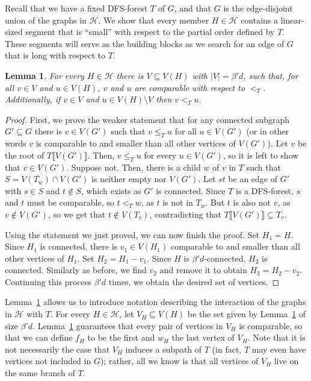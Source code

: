 \documentclass[10pt]{article}
\newtheorem{lemma}[theorem]{Lemma}
\theoremstyle{definition}
\let\leq\leqslant
\begin{document}
Recall that we have a fixed DFS-forest $T$ of $G$, and that $G$ is the edge-disjoint union of the graphs in $\mathcal{H}$. We show that every member $H\in \mathcal{H}$ contains a linear-sized segment that is ``small'' with respect to the partial order defined by $T$. These segments will serve as the building blocks as we search for an edge of $G$ that is long with respect to $T$.

\begin{lemma}\label{lem: cluster in dfs tree}
    For every $H\in\mathcal H$ there is $V\subseteq V(H)$ with $|V|=\beta' d$, such that, for all $v\in V$ and $u\in V(H)$, $v$ and $u$ are comparable with respect to $<_T$. Additionally, if $v\in V$ and $u\in V(H)\setminus V$ then $v<_Tu$.
    
    \end{lemma}
\begin{proof}
    First, we prove the weaker statement that for any connected subgraph $G'\subseteq G$ there is $v\in V(G')$ such that $v\leq_T u$ for all $u\in V(G')$ (or in other words $v$ is comparable to and smaller than all other vertices of $V(G')$). Let $v$ be the root of $T\llbracket{V(G')}\rrbracket$. Then, $v\leq_T u$ for every $u\in V(G')$, so it is left to show that $v\in V(G')$. Suppose not. Then, there is a child $w$ of $v$ in $T$ such that $S=V(T_w)\cap V(G')$ is neither empty nor $V(G')$. Let $st$ be an edge of $G'$ with $s\in S$ and $t\notin S$, which exists as $G'$ is connected. Since $T$ is a DFS-forest, $s$ and $t$ must be comparable, so $t<_T w$, as $t$ is not in $T_w$. But $t$ is also not $v$, as $v\notin V(G')$, so we get that $t\notin V(T_v)$, contradicting that $T\llbracket{V(G')}\rrbracket\subseteq T_v$.

    Using the statement we just proved, we can now finish the proof. Set $H_1=H$. Since $H_1$ is connected, there is $v_1\in V(H_1)$ comparable to and smaller than all other vertices of $H_1$. Set $H_2=H_1-v_1$. Since $H$ is $\beta' d$-connected, $H_2$ is connected. Similarly as before, we find $v_2$ and remove it to obtain $H_3=H_2-v_2$. Continuing this process $\beta'  d$ times, we obtain the desired set of vertices.
\end{proof}
Lemma~\ref{lem: cluster in dfs tree} allows us to introduce notation describing the interaction of the graphs in $\mathcal H$ with $T$. For every $H\in\mathcal H$, let $V_H\subseteq V(H)$ be the set given by Lemma~\ref{lem: cluster in dfs tree} of size $\beta' d$. Lemma~\ref{lem: cluster in dfs tree} guarantees that every pair of vertices in $V_H$ is comparable, so that we can define $f_H$ to be the first and $w_H$ the last vertex of $V_H$. Note that it is not necessarily the case that $V_H$ induces a subpath of $T$ (in fact, $T$ may even have vertices not included in $G$); rather, all we know is that all vertices of $V_H$ live on the same branch of $T$. 
\end{document}
